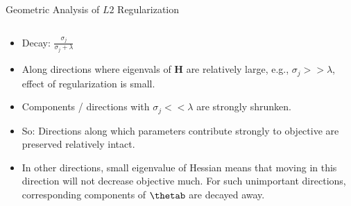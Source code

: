 \documentclass[11pt,compress,t,notes=noshow, xcolor=table]{beamer}
\begin{document}
\begin{vbframe}{Geometric Analysis of $L2$ Regularization}
\framebreak

  
  
  
  \begin{columns}
    \begin{column}{0.5\textwidth}
      
      {\scriptsize
      \begin{itemize}\setlength{\itemsep}{1.0em}
          \item  Decay: $\frac{\sigma_j}{\sigma_j + \lambda}$ 
          \item Along directions where eigenvals of $\bm{H}$ are relatively large, e.g.,  $\sigma_j >> \lambda$, effect of regularization is small.
  \item Components / directions with $\sigma_j << \lambda$ are strongly shrunken.
  \item So: Directions along which parameters contribute strongly to objective are preserved relatively intact.
  \item In other directions, small eigenvalue of Hessian means that moving in this direction will not decrease objective much. For such unimportant directions, corresponding components of $\thetab$ are decayed away.
        \end{itemize}
      }
      \end{column}
    

\end{columns}
\end{vbframe}
\end{document}
